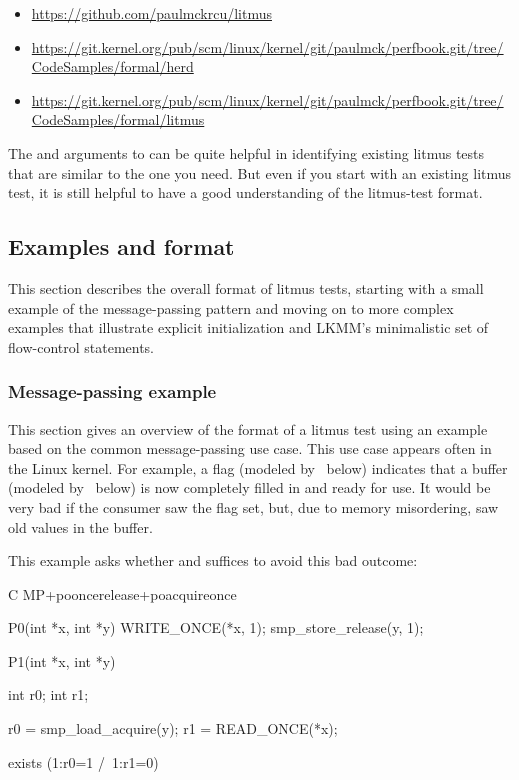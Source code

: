 \begin{itemize}
  \item \url{https://github.com/paulmckrcu/litmus}
  \item \url{https://git.kernel.org/pub/scm/linux/kernel/git/paulmck/perfbook.git/tree/CodeSamples/formal/herd}
  \item \url{https://git.kernel.org/pub/scm/linux/kernel/git/paulmck/perfbook.git/tree/CodeSamples/formal/litmus}
\end{itemize}

The  and  arguments to  can be quite helpful
in identifying existing litmus tests that are similar to the one you need.
But even if you start with an existing litmus test, it is still helpful
to have a good understanding of the litmus-test format.


\subsection{Examples and format}

This section describes the overall format of litmus tests, starting
with a small example of the message-passing pattern and moving on to
more complex examples that illustrate explicit initialization and LKMM's
minimalistic set of flow-control statements.


\subsubsection{Message-passing example}

This section gives an overview of the format of a litmus test using an
example based on the common message-passing use case.
This use case appears often in the Linux kernel.
For example, a flag (modeled by~ below) indicates that a buffer
(modeled by~ below) is now completely filled in and ready for use.
It would be very bad if the consumer saw the flag set, but, due to memory
misordering, saw old values in the buffer.

This example asks whether  and 
suffices to avoid this bad outcome:

\begin{fcvlabel}
\begin{VerbatimN}[commandchars=\%\@\$]
	C MP+pooncerelease+poacquireonce  %

	{}    %

	P0(int *x, int *y)   %
	{
		WRITE_ONCE(*x, 1);   %
		smp_store_release(y, 1);   %
	}   %

	P1(int *x, int *y)   %
	{
		int r0;   %
		int r1;   %

		r0 = smp_load_acquire(y);   %
		r1 = READ_ONCE(*x);    %
	}   %

	exists (1:r0=1 /\ 1:r1=0)  %
\end{VerbatimN}
\end{fcvlabel}

